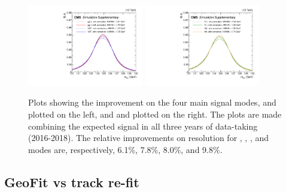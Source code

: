 \begin{figure}[!htb]
      \centering
      \captionsetup{justification=justified}
      \includegraphics[width=0.45\textwidth]{pics/muon_corr/GeoFit/performance/ggHVBF.pdf}
      \includegraphics[width=0.45\textwidth]{pics/muon_corr/GeoFit/performance/VHttH.pdf}
      \caption{Plots showing the \GeoFit improvement on the four main \hmm signal modes, 
               \ggH and \qqH plotted on the left, and \VH and \ttH plotted on the right.
               The plots are made combining the expected signal in all three years of data-taking (2016-2018).
               The relative improvements on \mmm resolution for \ggH, \qqH, \VH, and \ttH modes are, respectively,
               6.1\%, 7.8\%, 8.0\%, and 9.8\%.
               }
      \label{fig:geofit_sigs}
\end{figure}



\subsection{GeoFit vs track re-fit}\label{sec:track_refit}

